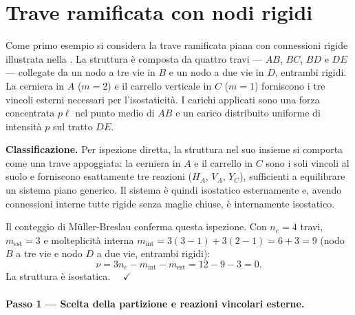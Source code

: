 \section{Trave ramificata con nodi rigidi}
\label{sec:trave_ramificata}

Come primo esempio si considera la trave ramificata
piana con connessioni rigide illustrata nella
. La struttura è
composta da quattro travi --- $AB$, $BC$, $BD$
e $DE$ --- collegate da un nodo a tre vie in $B$
e un nodo a due vie in $D$, entrambi rigidi.
La cerniera in $A$ ($m = 2$) e il carrello
verticale in $C$ ($m = 1$) forniscono i tre
vincoli esterni necessari per l'isostaticità.
I carichi applicati sono una forza concentrata
$p\ell$ nel punto medio di $AB$ e un carico
distribuito uniforme di intensità $p$ sul
tratto $DE$.





\noindent\textbf{Classificazione.}
Per ispezione diretta, la struttura nel suo insieme
si comporta come una trave appoggiata: la cerniera
in $A$ e il carrello in $C$ sono i soli vincoli
al suolo e forniscono esattamente tre reazioni
($H_A$, $V_A$, $Y_C$), sufficienti a equilibrare
un sistema piano generico. Il sistema è quindi
isostatico esternamente e, avendo connessioni
interne tutte rigide senza maglie chiuse, è
internamente isostatico.

Il conteggio di Müller-Breslau conferma questa
ispezione. Con $n_e = 4$ travi, $m_\text{est} = 3$
e molteplicità interna $m_\text{int} = 3(3-1) +
3(2-1) = 6 + 3 = 9$ (nodo $B$ a tre vie e nodo
$D$ a due vie, entrambi rigidi):
\[
\nu = 3n_e - m_\text{int} - m_\text{est}
= 12 - 9 - 3 = 0.
\]
La struttura è isostatica. $\quad\checkmark$


\paragraph{Passo 1 --- Scelta della partizione e
	reazioni vincolari esterne.}

